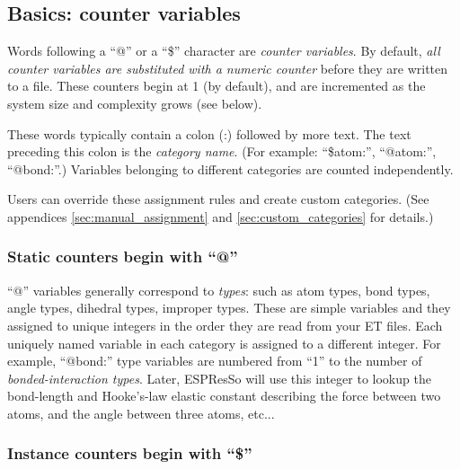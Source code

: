 \documentclass[11pt]{article}
\begin{document}
\subsection{Basics: counter variables}
\label{sec:variables}

Words following a ``@'' or a ``\$'' character
are \textit{counter variables}. 
By default, 
\textit{all counter variables are substituted with a numeric counter}
before they are written to a file. 
These counters begin at 1 (by default), and 
are incremented as the system size and complexity grows (see below).

These words typically contain a colon (:) followed by more text.
The text preceding this colon is the \textit{category name}. 
(For example: ``\$atom:'', ``@atom:'', ``@bond:''.)
Variables belonging to different categories 
are counted independently. 

Users can override these assignment rules and create custom categories.
(See appendices \ref{sec:manual_assignment} and \ref{sec:custom_categories}
for details.)

\subsubsection{Static counters begin with ``@''}
\label{sec:static_variables}

``@'' variables generally correspond to \textit{types}: 
such as atom types, bond types, angle types, dihedral types, improper types.
These are simple variables and they assigned to unique integers in the 
order they are read from your ET files.
Each uniquely named variable in each category is assigned to a different 
integer.  For example, ``@bond:'' type variables are numbered from ``1''
to the number of \textit{bonded-interaction types}.
Later, ESPResSo will use this integer to lookup the bond-length and Hooke's-law 
elastic constant describing the force between two atoms, and the
angle between three atoms, etc...


\subsubsection{Instance counters begin with ``\$''}
\label{sec:instance_variables}
\end{document}
